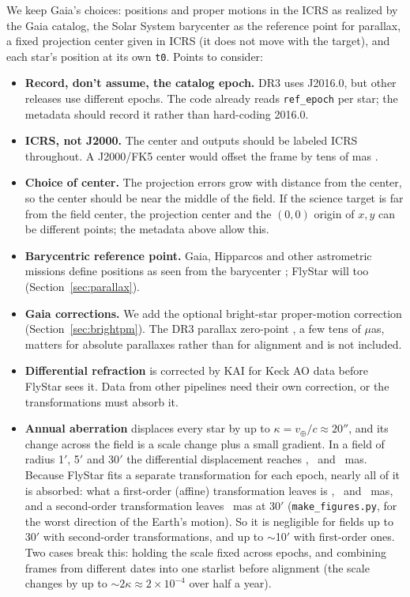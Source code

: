 \documentclass[11pt]{article}
\newcommand{\code}[1]{\texttt{#1}}
\newcommand{\muas}{$\mu$as}
\begin{document}
We keep Gaia's choices: positions and proper motions in the ICRS as realized
by the Gaia catalog, the Solar System barycenter as the reference point for
parallax, a fixed projection center given in ICRS (it does not move with the
target), and each star's position at its own \code{t0}. Points to consider:
\begin{itemize}
  \item \textbf{Record, don't assume, the catalog epoch.} DR3 uses J2016.0, but
    other releases use different epochs. The code already reads
    \code{ref\_epoch} per star; the metadata should record it rather than
    hard-coding 2016.0.
  \item \textbf{ICRS, not J2000.} The center and outputs should be labeled ICRS
    throughout. A J2000/FK5 center would offset the frame by tens of mas
    \citep{FeisselMignard1998}.
  \item \textbf{Choice of center.} The projection errors grow with distance
    from the center, so the center should be near the middle of the field. If
    the science target is far from the field center, the projection center
    and the $(0,0)$ origin of $x,y$ can be different points; the metadata above
    allow this.
  \item \textbf{Barycentric reference point.} Gaia, Hipparcos and other
    astrometric missions define positions as seen from the barycenter
    \citep{ESA1997, Lindegren2012}; FlyStar will too
    (Section~\ref{sec:parallax}).
  \item \textbf{Gaia corrections.} We add the optional bright-star
    proper-motion correction (Section~\ref{sec:brightpm}). The DR3 parallax
    zero-point \citep{Lindegren2021b}, a few tens of \muas, matters for
    absolute parallaxes rather than for alignment and is not included.
  \item \textbf{Differential refraction} is corrected by KAI for Keck AO
    data before FlyStar sees it. Data from other pipelines need their own
    correction, or the transformations must absorb it.
  \item \textbf{Annual aberration} displaces every star by up to
    $\kappa = v_\oplus/c \approx 20''$, and its change across the field is a
    scale change plus a small gradient. In a field of radius 1$'$, 5$'$ and
    30$'$ the differential displacement reaches \AberRawOne, \AberRawFive\ and
    \AberRawThirty~mas. Because FlyStar fits a separate transformation for
    each epoch, nearly all of it is absorbed: what a first-order (affine)
    transformation leaves is \AberAffOne, \AberAffFive\ and
    \AberAffThirty~mas, and a second-order transformation leaves
    \AberQuadThirty~mas at 30$'$ (\code{make\_figures.py}, for the worst
    direction of the Earth's motion). So it is negligible for fields up to
    30$'$ with second-order transformations, and up to $\sim$10$'$ with
    first-order ones. Two cases break this: holding the scale fixed across
    epochs, and combining frames from different dates into one starlist
    before alignment (the scale changes by up to $\sim$$2\kappa \approx 2\times10^{-4}$
    over half a year).
\end{itemize}
\end{document}
